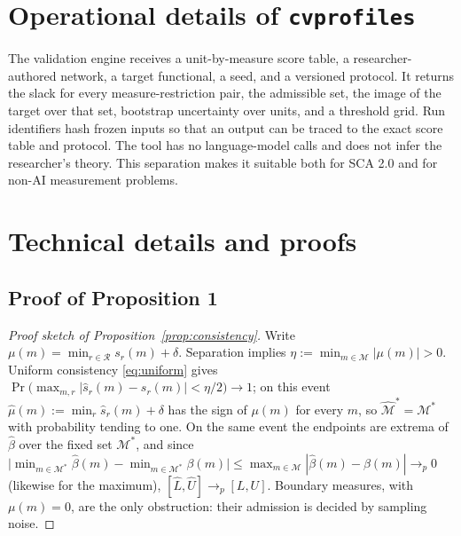 \documentclass[10pt,letterpaper]{article}
\newcommand{\cvp}{\texttt{cvprofiles}}
\newcommand{\M}{\ensuremath{\mathcal{M}}}
\begin{document}
\section{Operational details of \cvp{}}
The validation engine receives a unit-by-measure score table, a researcher-authored network, a target functional, a seed, and a versioned protocol. It returns the slack for every measure-restriction pair, the admissible set, the image of the target over that set, bootstrap uncertainty over units, and a threshold grid. Run identifiers hash frozen inputs so that an output can be traced to the exact score table and protocol. The tool has no language-model calls and does not infer the researcher's theory. This separation makes it suitable both for SCA 2.0 and for non-AI measurement problems.

\section{Technical details and proofs}

\subsection{Proof of Proposition 1}
\begin{proof}[Proof sketch of Proposition~\ref{prop:consistency}]
Write $\mu(m)=\min_{r\in\mathcal{R}}s_r(m)+\delta$. Separation implies $\eta:=\min_{m\in\M}|\mu(m)|>0$. Uniform consistency \eqref{eq:uniform} gives $\Pr\bigl(\max_{m,r}|\hat{s}_r(m)-s_r(m)|<\eta/2\bigr)\to 1$; on this event $\hat{\mu}(m):=\min_r\hat{s}_r(m)+\delta$ has the sign of $\mu(m)$ for every $m$, so $\hat{\M}^*=\M^*$ with probability tending to one. On the same event the endpoints are extrema of $\hat{\beta}$ over the fixed set $\M^*$, and since $\bigl|\min_{m\in\M^*}\hat{\beta}(m)-\min_{m\in\M^*}\beta(m)\bigr|\le\max_{m\in\M}|\hat{\beta}(m)-\beta(m)|\to_p 0$ (likewise for the maximum), $[\hat L,\hat U]\to_p[L,U]$. Boundary measures, with $\mu(m)=0$, are the only obstruction: their admission is decided by sampling noise.
\end{proof}
\end{document}
